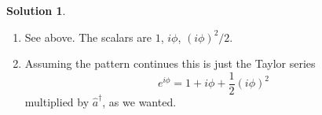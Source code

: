 \documentclass[10pt]{article}
\theoremstyle{definition}
\newtheorem{soln}{Solution}
\begin{document}
\begin{soln}
\begin{enumerate}[label=(\alph*)]
\begin{align*}
            +\frac{1}{2}\hat{a}\hat{a}^\dagger                                                                                  \\
             & =\frac{1}{2}\left(\hat{a}^\dagger\hat{a}-\hat{a}\hat{a}^\dagger\right)\hat{a}^\dagger\hat{a}
            +\frac{1}{2}\hat{a}\hat{a}^\dagger                                                                                  \\
             & =-\frac{1}{2}\left(\hat{a}\hat{a}^\dagger-\hat{a}^\dagger\hat{a}\right)\hat{a}^\dagger\hat{a}
            +\frac{1}{2}\hat{a}\hat{a}^\dagger                                                                                  \\
             & =-\frac{1}{2}\hat{a}^\dagger\hat{a}
            +\frac{1}{2}\hat{a}\hat{a}^\dagger                                                                                  \\
             & =\frac{1}{2}
          \end{align*}
          where I think the algebra is clear at every step. We're just trying to massage the expression to get terms that look like $\hat{a}\hat{a}^\dagger-\hat{a}^\dagger\hat{a}=\left[\hat{a},\hat{a}^\dagger\right]=1$.
          I've also just realized I'm basically doing part (c) here.
    \item See above. The scalars are $1$, $i\phi$, $(i\phi)^2/2$.
    \item Assuming the pattern continues this is just the Taylor series
          $$e^{i\phi}=1+i\phi+\frac{1}{2}(i\phi)^2$$
          multiplied by $\hat{a}^\dagger$, as we wanted.
  \end{enumerate}
\end{soln}
\end{document}
